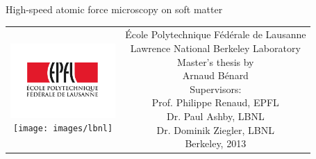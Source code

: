 \begin{titlepage}
\begin{center}
\sffamily


\null\vspace{2cm}
{\huge High-speed atomic force microscopy on soft matter}

    
\vfill

\begin{tabular} {cc}
\parbox{0.3\textwidth}{
	\includegraphics[width=4cm]{images/epfl}\\
	\texttt{[image: images/lbnl]}}
&
\parbox{0.7\textwidth}{
	École Polytechnique Fédérale de Lausanne\\[6pt]
	Lawrence National Berkeley Laboratory\\
	Master's thesis by \\ [4pt]
	\null \hspace{3em} Arnaud Bénard\\[9pt]
	\small
	Supervisors:\\[4pt]
	    Prof. Philippe Renaud, EPFL\\
	    Dr. Paul Ashby, LBNL\\
	    Dr. Dominik Ziegler, LBNL\\[12pt]
	Berkeley, 2013
}
\end{tabular}

\end{center}
\vspace{2cm}
\end{titlepage}